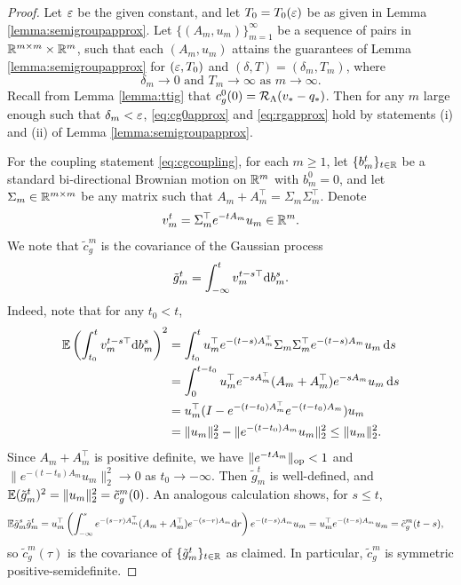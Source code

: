\begin{proof}
Let $\varepsilon$ be the given constant, and
let $T_0=T_0(\varepsilon)$ be as given in Lemma \ref{lemma:semigroupapprox}. Let
$\{(A_m,u_m)\}_{m=1}^\infty$ be a sequence of pairs in $\mathbb{R}^{m \times m} \times
\mathbb{R}^m$, such that each $(A_m,u_m)$ attains the guarantees of Lemma
\ref{lemma:semigroupapprox} for $(\varepsilon,T_0)$ and $(\delta,T)=(\delta_m,T_m)$,
where
\[\delta_m \to 0 \text{ and } T_m \to \infty \text{ as }
m \to \infty.\]
Recall from Lemma \ref{lemma:ttig} that $c_g^0(0)=\mathcal{R}_\Lambda(v_*-q_*)$.
Then for any $m$ large enough such that $\delta_m<\varepsilon$, \eqref{eq:cg0approx}
and \eqref{eq:rgapprox}
hold by statements (i) and (ii) of Lemma \ref{lemma:semigroupapprox}.

For the coupling statement \eqref{eq:cgcoupling},
for each $m \geq 1$, let $\{b_m^t\}_{t \in \mathbb{R}}$ be a standard bi-directional
Brownian motion on $\mathbb{R}^m$ with $b_m^0=0$,
and let $\Sigma_m \in \mathbb{R}^{m \times m}$ be any matrix such that
$A_m+A_m^\top=\Sigma_m\Sigma_m^\top$. Denote
\[v_m^t=\Sigma_m^\top e^{-t A_m}u_m \in \mathbb{R}^m.\]
We note that $\tilde c_g^m$ is the
covariance of the Gaussian process
\[\tilde g_m^t=\int_{-\infty}^t v_m^{t-s\top}\mathrm{d} b_m^s.\]
Indeed, note that for any $t_0<t$,
\begin{align*}
\mathbb{E}\left(\int_{t_0}^t v_m^{t-s\top}\mathrm{d} b_m^s\right)^2
&=\int_{t_0}^t u_m^\top e^{-(t-s)A_m^\top}\Sigma_m\Sigma_m^\top
e^{-(t-s)A_m}u_m\,\mathrm{d} s\\
&=\int_0^{t-t_0} u_m^\top e^{-sA_m^\top}(A_m+A_m^\top)
e^{-sA_m}u_m\,\mathrm{d} s\\
&=u_m^\top(I-e^{-(t-t_0)A_m^\top}e^{-(t-t_0)A_m})u_m\\
&=\|u_m\|_2^2-\|e^{-(t-t_0)A_m}u_m\|_2^2 \leq \|u_m\|_2^2.
\end{align*}
Since $A_m+A_m^\top$ is positive definite, we have
$\|e^{-tA_m}\|_{\mathrm{op}}<1$ and 
$\|e^{-(t-t_0)A_m}u_m\|_2^2 \to 0$ as $t_0 \to -\infty$. Then $\tilde g_m^t$ is
well-defined, and $\mathbb{E}(\tilde g_m^t)^2=\|u_m\|_2^2=\tilde c_g^m(0)$.
An analogous calculation shows, for $s \leq t$,
\begin{align*}
\mathbb{E}\tilde g_m^s\tilde g_m^t&=u_m^\top 
\left(\int_{-\infty}^s e^{-(s-r)A_m^\top}(A_m+A_m^\top)e^{-(s-r)A_m}\mathrm{d} r\right)
e^{-(t-s)A_m}u_m=u_m^\top e^{-(t-s)A_m}u_m=\tilde c_g^m(t-s),
\end{align*}
so $\tilde c_g^m(\tau)$ is the covariance of $\{\tilde g_m^t\}_{t \in \mathbb{R}}$ as
claimed. In particular, $\tilde c_g^m$ is symmetric positive-semidefinite.


\end{proof}
